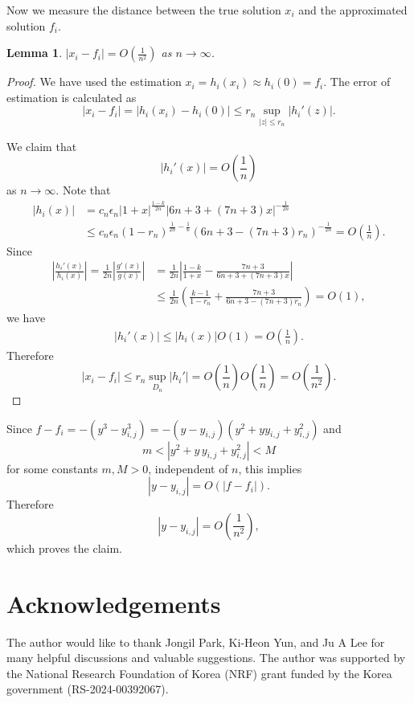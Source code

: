\documentclass[10pt,a4paper,reqno]{amsart}
\newtheorem{lem}[thm]{Lemma}
\theoremstyle{definition}
\numberwithin{equation}{section}
\numberwithin{figure}{section}
\newcommand{\ep}{\epsilon}
\newcommand{\arrowr}{\rightarrow}
\begin{document}
Now we measure the distance between the true solution $x_i$ and the approximated solution $f_i$.
\begin{lem} \label{lem:app2}
$|x_i-f_i|=O\left(\frac{1}{n^2}\right)$ as $n\arrowr \infty$.
\end{lem}


\begin{proof}
We have used the estimation $x_i=h_i(x_i) \approx h_i(0)=f_i$.
The error of estimation is calculated as
\[|x_i-f_i|=|h_i(x_i)-h_i(0)|\le r_n \sup_{|z|\le r_n}|h_i'(z)|.\]

We claim that \[|h_i'(x)|=O\left(\frac{1}{n}\right)\] as $n \arrowr \infty$.
Note that 
\begin{align*}
|h_i(x)|&=c_n \ep_n |1+x|^{\frac{1-k}{2n}}|6n+3+(7n+3)x|^{-\frac{1}{2n}} \\
&\le c_n \ep_n (1-r_n)^{\frac{1}{2n}-\frac{1}{6}}(6n+3 -(7n+3)r_n)^{-\frac{1}{2n}}=O\left(\frac{1}{n}\right).
\end{align*}
Since
\begin{align*}
\left|\frac{h_i'(x)}{h_i(x)}\right|=\frac{1}{2n}\left|\frac{g'(x)}{g(x)}\right|&=\frac{1}{2n}\left| \frac{1-k}{1+x} - \frac{7n+3}{6n+3+(7n+3)x}\right| \\
&\le \frac{1}{2n}\left( \frac{k-1}{1-r_n} + \frac{7n+3}{6n+3-(7n+3)r_n}\right)=O(1),
\end{align*}
we have 
\begin{align*}
|h_i'(x)|\le |h_i(x)| O(1)=O\left(\frac{1}{n}\right).
\end{align*} 
Therefore
\[|x_i-f_i|\le r_n \sup_{D_n}|h_i'| =O\!\left(\frac1n\right)O\!\left(\frac1n\right)=O\!\left(\frac1{n^2}\right).\]
\end{proof}

Since $f-f_i=-(y^3-y_{i,j}^3)=-(y-y_{i,j})(y^2+y y_{i,j}+y_{i,j}^2)$
and \[m<|y^2+y\,y_{i,j}+y_{i,j}^2|<M\]
for some constants $m,M>0$, independent of $n$,
this implies
\[|y-y_{i,j}|=O(|f-f_i|).\]
Therefore
\[|y-y_{i,j}|=O\!\left(\frac1{n^2}\right),\]
which proves the claim.


\section*{Acknowledgements}
The author would like to thank Jongil Park, Ki-Heon Yun, and Ju A Lee 
for many helpful discussions and valuable suggestions. 
The author was supported by the National Research Foundation of Korea (NRF) grant funded by the Korea government (RS-2024-00392067).
\end{document}
